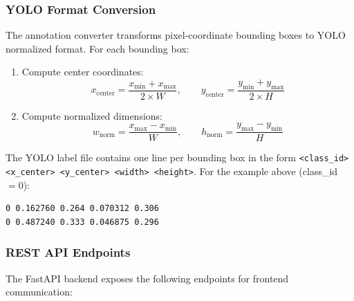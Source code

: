 \documentclass[12pt, letterpaper]{article}
\begin{document}
\subsubsection{YOLO Format Conversion}

The annotation converter transforms pixel-coordinate bounding boxes to YOLO normalized
format. For each bounding box:

\begin{enumerate}
  \item Compute center coordinates:
    \begin{equation}
      x_{\text{center}} = \frac{x_{\min} + x_{\max}}{2 \times W}, \qquad
      y_{\text{center}} = \frac{y_{\min} + y_{\max}}{2 \times H}
    \end{equation}
  \item Compute normalized dimensions:
    \begin{equation}
      w_{\text{norm}} = \frac{x_{\max} - x_{\min}}{W}, \qquad
      h_{\text{norm}} = \frac{y_{\max} - y_{\min}}{H}
    \end{equation}
\end{enumerate}

The YOLO label file contains one line per bounding box in the form
\texttt{<class\_id> <x\_center> <y\_center> <width> <height>}.
For the example above (class\_id $= 0$):

\begin{verbatim}
0 0.162760 0.264 0.070312 0.306
0 0.487240 0.333 0.046875 0.296
\end{verbatim}

\subsubsection{REST API Endpoints}

The FastAPI backend exposes the following endpoints for frontend communication:
\end{document}
